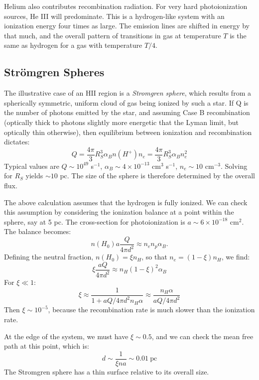 Helium also contributes recombination radiation. For very hard
photoionization sources, He III will predominate. This is a
hydrogen-like system with an ionization energy four times as
large. The emission lines are shifted in energy by that much, and the
overall pattern of transitions in gas at temperature $T$ is the same
as hydrogen for a gas with temperature $T/4$.

\subsection{Str{\"o}mgren Spheres}

The illustrative case of an HII region is a {\it Stromgren sphere},
which results from a spherically symmetric, uniform cloud of gas being
ionized by such a star. If Q is the number of photons emitted by the
star, and assuming Case B recombination (optically thick to photons
slightly more energetic that the Lyman limit, but optically thin
otherwise), then equilibrium between ionization and recombination
dictates:
\begin{equation}
Q = \frac{4\pi}{3} R_{S}^3 \alpha_B n(H^{+}) n_e = 
\frac{4\pi}{3} R_{S}^3 \alpha_B n_e^2 
\end{equation}
Typical values are $Q\sim 10^{49}$ s$^{-1}$, $\alpha_B \sim
4\times10^{-13}$ cm$^3$ s$^{-1}$, $n_e \sim 10$ cm$^{-3}$. Solving for
$R_S$ yields $\sim 10$ pc. The size of the sphere is therefore
determined by the overall flux.

The above calculation assumes that the hydrogen is fully ionized. We
can check this assumption by considering the ionization balance at a
point within the sphere, say at 5 pc. The cross-section for
photoionization is $a \sim 6 \times 10^{-18}$ cm$^{2}$. The balance
becomes:
\begin{equation}
n(H_0)  a \frac{Q}{4\pi d^2} \approx n_e n_p \alpha_B.
\end{equation}
Defining the neutral fraction, $n(H_0) = \xi n_H$, so
that $n_e = (1-\xi) n_H$, we find:
\begin{equation}
\xi \frac{a Q}{4 \pi d^2} \approx n_H (1-\xi)^2 \alpha_B
\end{equation}
For $\xi\ll 1$:
\begin{equation}
\xi \approx \frac{1}{1 + aQ/4\pi d^2
n_H \alpha} \approx \frac{n_H \alpha}{a Q / 4\pi d^2}
\end{equation}
Then $\xi \sim 10^{-5}$, because the recombination rate is much slower
than the ionization rate. 

At the edge of the system, we must have $\xi\sim 0.5$, and we can
check the mean free path at this point, which is:
\begin{equation}
d \sim \frac{1}{\xi n a} \sim 0.01 \mathrm{~pc}
\end{equation}
The Stromgren sphere has a thin surface relative to its overall size.

